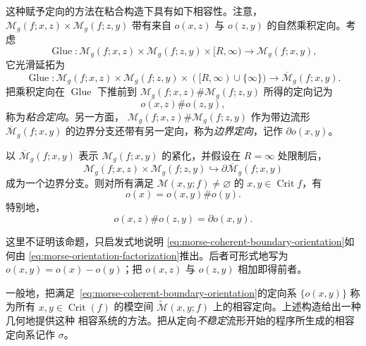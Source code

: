 这种赋予定向的方法在粘合构造下具有如下相容性。注意，
$\mathcal M_g(f;x,z)\times\mathcal M_g(f;z,y)$ 带有来自 $o(x,z)$ 与 $o(z,y)$
的自然乘积定向。考虑\termGluingMap{}
\[
 \operatorname{Glue}:\mathcal M_g(f;x,z)\times\mathcal M_g(f;z,y)
 \times[R,\infty)\longrightarrow\mathcal M_g(f;x,y),
\]
它光滑延拓为
\[
 \operatorname{Glue}:\mathcal M_g(f;x,z)\times\mathcal M_g(f;z,y)
 \times([R,\infty)\cup\{\infty\})\longrightarrow
 \overline{\mathcal M}_g(f;x,y).
\]
把乘积定向在 $\operatorname{Glue}$ 下推前到
$\mathcal M_g(f;x,z)\#\mathcal M_g(f;z,y)$ 所得的定向记为
\[
 o(x,z)\#o(z,y),
\]
称为\emph{粘合定向}。另一方面，
$\mathcal M_g(f;x,z)\#\mathcal M_g(f;z,y)$ 作为带边流形
$\overline{\mathcal M}_g(f;x,y)$ 的边界分支还带有另一定向，称为\emph{边界定向}，记作
$\partial o(x,y)$。

\begin{proposition}
\label{prop:morse-coherent-orientation-gluing}
以 $\overline{\mathcal M}_g(f;x,y)$ 表示
$\mathcal M_g(f;x,y)$ 的紧化，并假设在 $R=\infty$ 处限制\termGluingMap{}后，
\[
 \mathcal M_g(f;x,z)\times\mathcal M_g(f;z,y)
 \hookrightarrow\partial\overline{\mathcal M}_g(f;x,y)
\]
成为一个边界分支。则对所有满足
$\mathcal M(x,y;f)\neq\varnothing$ 的 $x,y\in\operatorname{Crit}f$，有
\begin{equation}
 o(x)=o(x,y)\#o(y).
 \label{eq:morse-orientation-factorization}
\end{equation}
特别地，
\begin{equation}
 o(x,z)\#o(z,y)=\partial o(x,y).
 \label{eq:morse-coherent-boundary-orientation}
\end{equation}
\end{proposition}

这里不证明该命题，只启发式地说明
\eqref{eq:morse-coherent-boundary-orientation}如何由
\eqref{eq:morse-orientation-factorization}推出。后者可形式地写为
$o(x,y)=o(x)-o(y)$；把 $o(x,z)$ 与 $o(z,y)$ 相加即得前者。

一般地，把满足~\eqref{eq:morse-coherent-boundary-orientation}的定向系
$\{o(x,y)\}$ 称为所有 $x,y\in\operatorname{Crit}(f)$ 的\personMorse{}模空间
$\widetilde{\mathcal M}(x,y;f)$ 上的相容定向。上述构造给出一种几何地提供这种
相容系统的方法。把从定向\emph{不稳定}流形开始的程序所生成的相容定向系记作 $\sigma$。

